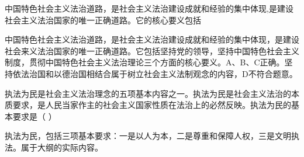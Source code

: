 \question 中国特色社会主义法治道路，是社会主义法治建设成就和经验的集中体现,是建设社会主义法治国家的唯一正确道路。它的核心要义包括
\par{}
\begin{solution}中国特色社会主义法治道路，是社会主义法治建设成就和经验的集中体现，是建设社会来义法治国家的唯一正确道路。它包括坚持党的领导，坚持中国特色社会主义制度，贯彻中国特色社会主义法治理论三个方面的核心要义。A、B、C正确。坚持依法治国和以德治国相结合属于树立社会主义法制观念的内容，D不符合题意。
\end{solution}
\question 执法为民是社会主义法治理念的五项基本内容之一。执法为民是社会主义法治的本质要求，是人民当家作主的社会主义国家性质在法治上的必然反映。执法为民的基本要求是（
）
\par{}
\begin{solution}执法为民，包括三项基本要求：一是以人为本，二是尊重和保障人权，三是文明执法。属于大纲的实际内容。
\end{solution}
